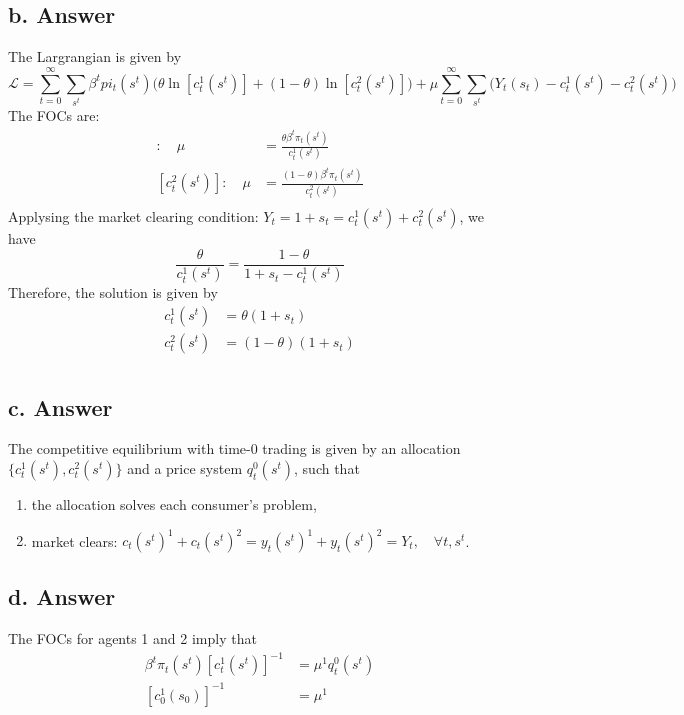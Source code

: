 \documentclass[11pt]{article}
\theoremstyle{definition}
\theoremstyle{boldtitle} %
\numberwithin{equation}{section}
\numberwithin{figure}{section}
\numberwithin{table}{section}
\begin{document}
\subsection{b. Answer} 
The Largrangian is given by 
\[
\mathcal{L} =  \sum_{t=0}^\infty \sum_{s^t} \beta^t  pi_t(s^t)  \bigg(\theta \ln \left[ c_t^1 (s^t) \right] + (1 - \theta) \ln \left[ c_t^2 (s^t) \right] \bigg) 
+ \mu \sum_{t=0}^\infty \sum_{s^t} \bigg(Y_t(s_t) - c_t^1 (s^t) - c_t^2 (s^t) \bigg)
\]
The FOCs are:
\begin{align*}
    [c^1_t(s^t)]: \quad \mu & = \frac{\theta \beta^t \pi_t(s^t) }{c_t^1(s^t)} \\
    [c^2_t(s^t)]: \quad \mu & = \frac{(1 - \theta) \beta^t \pi_t(s^t) }{c_t^2(s^t)}  \\
\end{align*}
Applysing the market clearing condition: $Y_t = 1 + s_t = c_t^1(s^t) + c_t^2(s^t)$, we have 
\[
\frac{\theta  }{c_t^1(s^t)} = \frac{1 - \theta  }{1+ s_t - c_t^1(s^t)} 
\]
Therefore, the solution is given by 
\begin{align*}
    c^1_t(s^t) & =  \theta (1 + s_t) \\
    c^2_t(s^t) & =  (1 - \theta) (1 + s_t) \\
\end{align*}


\subsection{c. Answer} 
The competitive equilibrium with time-0 trading is given by 
an allocation $\{c_t^1(s^t), c_t^2(s^t)\}$ and a price system $q_t^0(s^t)$, such that 
\begin{enumerate}
    \item the allocation solves each consumer's problem,
    \item market clears: ${c_t(s^t)}^1 + {c_t(s^t)}^2 = {y_t(s^t)}^1 + {y_t(s^t)}^2 = Y_t, \quad \forall t, s^t$. 
\end{enumerate}


\subsection{d. Answer} 
The FOCs for agents 1 and 2 imply that
\begin{align*}
    \beta^t \pi_t(s^t) [c_t^1(s^t)]^{-1} &= \mu^1 q_t^0(s^t) \\
    [c_0^1(s_0)]^{-1} &= \mu^1 
\end{align*}
\end{document}
